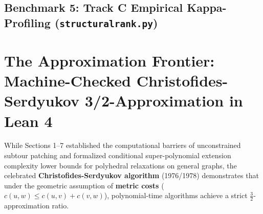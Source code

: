 \documentclass[11pt,a4paper]{article}
\renewcommand{\_}{\origunderscore\allowbreak}
\theoremstyle{plain}
\theoremstyle{definition}
\theoremstyle{remark}
\begin{document}
\subsection{Benchmark 5: Track C Empirical Kappa-Profiling (\texttt{structural\_rank.py})}
\begin{table}[htbp]
\centering
\caption{Empirical Cycle-Separation Rank $\hat{\kappa} = \lceil \log_n(\text{bb\_nodes}) \rceil$ Profiling across Graph Families.}
\label{tab:structural_rank}
\end{table}

\section{The Approximation Frontier: Machine-Checked Christofides-Serdyukov 3/2-Approximation in Lean 4}

While Sections 1--7 established the computational barriers of unconstrained subtour patching and formalized conditional super-polynomial extension complexity lower bounds for polyhedral relaxations on general graphs, the celebrated \textbf{Christofides-Serdyukov algorithm} (1976/1978) demonstrates that under the geometric assumption of \textbf{metric costs} ($c(u, w) \le c(u, v) + c(v, w)$), polynomial-time algorithms achieve a strict $\frac{3}{2}$-approximation ratio.
\end{document}
